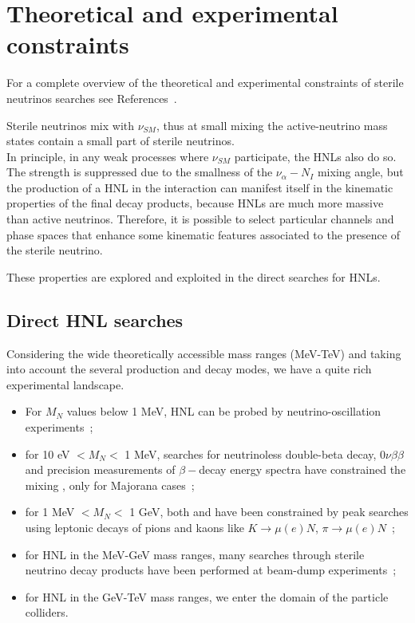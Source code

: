 \section{Theoretical and experimental constraints} \label{sec:currentlimits}
For a complete overview of the theoretical and experimental constraints of sterile neutrinos searches see References~\cite{Deppisch_2015,10.3389/fphy.2018.00040,PhysRevD.78.013010,Drewes_2017,DREWES2017250,Antusch_2014}.


Sterile neutrinos mix with $\nu_{SM}$, thus at small mixing the
active-neutrino mass states contain a small part of sterile
neutrinos.\\
In principle, in any weak processes where $\nu_{SM}$ participate, the
HNLs also do so. The strength is suppressed due to the smallness of
the $\nu_\alpha - N_I$ mixing angle,
but the production of a HNL in the interaction can manifest itself in the kinematic properties of the final decay products, because HNLs are much more massive than active neutrinos.
Therefore, it is possible to select particular channels and phase spaces that enhance some kinematic features associated to the presence of the sterile neutrino.

These properties are explored and exploited in the direct searches for HNLs.



\subsection{Direct HNL searches}\label{sec:c3directHNL}
Considering the wide theoretically accessible mass ranges (MeV-TeV) and taking into account
the several production and decay modes, we have a quite rich
experimental landscape. 
\begin{itemize}
\item For $M_N$ values below 1 MeV, HNL can be probed by
  neutrino-oscillation experiments~\cite{de_Gouv_a_2005};
\item for 10 eV $< M_N <$ 1 MeV, searches for neutrinoless double-beta decay,
  $0\nu\beta\beta$ and precision measurements of $\beta-$decay energy
  spectra have constrained the mixing \mixpare, only for Majorana cases~\cite{Deppisch_2015};
\item for 1 MeV $< M_N <$ 1 GeV, both \mixpare and \mixparm have been
  constrained by peak searches using leptonic decays of pions
  and kaons like $K \rightarrow \mu(e) N$, $\pi \rightarrow \mu(e)
  N$~\cite{Liventsev_2013};
\item for HNL in the MeV-GeV mass ranges, many searches through
  sterile neutrino decay products have been performed at beam-dump experiments~\cite{DORENBOSCH1986473};
\item for HNL in the GeV-TeV mass ranges, we enter the domain of
  the particle colliders.
\end{itemize}

